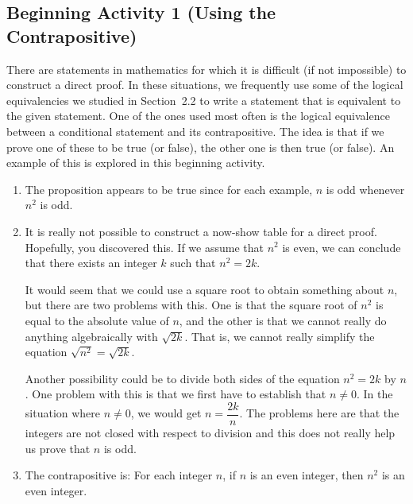 \documentclass[11pt]{article}
\begin{document}

\subsection*{Beginning Activity 1 (Using the Contrapositive)}
There are statements in mathematics for which it is difficult (if not impossible) to construct a direct proof.  In these situations, we frequently use some of the logical equivalencies we studied in Section~2.2 to write a statement that is equivalent to the given statement.  One of the ones used most often is the logical equivalence between a conditional statement and its contrapositive.  The idea is that if we prove one of these to be true (or false), the other one is then true (or false).  An example of this is explored in this beginning activity.

\begin{enumerate}
  \item The proposition appears to be true since for each example,   $n$  is odd whenever  $n^2$  is odd.
  \item It is really not possible to construct a now-show table for a direct proof.  Hopefully, you discovered this.  If we assume that  $n^2 $ is even, we can conclude that there exists an integer  $k$  such that  $n^2  = 2k$.  

It would seem that we could use a square root to obtain something about  $n$, but there are two problems with this.  One is that the square root of  $n^2 $ is equal to the absolute value of  
$n$, and the other is that we cannot really do anything algebraically with  $\sqrt {2k} $.  That is, we cannot really simplify the equation  $\sqrt {n^2 }  = \sqrt {2k} $.

Another possibility could be to divide both sides of the equation  $n^2  = 2k$ by $n$.  One problem with this is that we first have to establish that  $n \ne 0$.  In the situation where  $n \ne 0$, we would get  $n = \dfrac{{2k}}{n}$.  The problems here are that the integers are not closed with respect to division and this does not really help us prove that  $n$  is odd.

  \item The contrapositive is:  For each integer $n$, if $n$ is an even integer, then $n^2$ is an even integer.


\end{enumerate}
\end{document}
